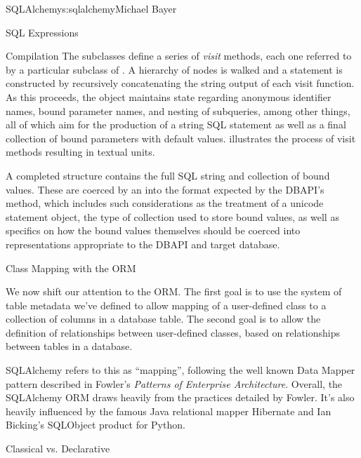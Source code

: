 \begin{aosachapter}{SQLAlchemy}{s:sqlalchemy}{Michael Bayer}
\begin{aosasect1}{SQL Expressions}
\begin{aosasect2}{Compilation}
The  subclasses define a series of \emph{visit} methods, each
one referred to by a particular subclass of .  A hierarchy
of  nodes is walked and a statement is constructed by
recursively concatenating the string output of each visit function.
As this proceeds, the  object maintains state regarding anonymous identifier names,
bound parameter names, and nesting of subqueries, among other things, all of which
aim for the production of a string SQL statement as well as a final
collection of bound parameters with default values.    illustrates
the process of visit methods resulting in textual units.


A completed  structure contains the full SQL string and
collection of bound values.   These are coerced by an
 into the format expected by the DBAPI's 
method,  which includes such considerations as the treatment of a unicode
statement object, the type of collection used
to store bound values, as well as specifics on how the bound values
themselves should be coerced into representations appropriate to the DBAPI and
target database.

\end{aosasect2}

\end{aosasect1}

\begin{aosasect1}{Class Mapping with the ORM}

We now shift our attention to the ORM.   The first goal is to use the system of table metadata we've defined
to allow mapping of a user-defined class to a collection of columns in a database table.   The second goal is to allow
the definition of relationships between user-defined classes, based on relationships between tables in a database.

SQLAlchemy refers to this as ``mapping'', following the well known Data Mapper pattern described
in Fowler's \emph{Patterns of Enterprise Architecture}.   Overall, the SQLAlchemy ORM draws heavily
from the practices detailed by Fowler.  It's also heavily influenced by the famous Java
relational mapper Hibernate and Ian Bicking's SQLObject product for Python.

\begin{aosasect2}{Classical vs. Declarative}


\end{aosasect2}
\end{aosasect1}
\end{aosachapter}
